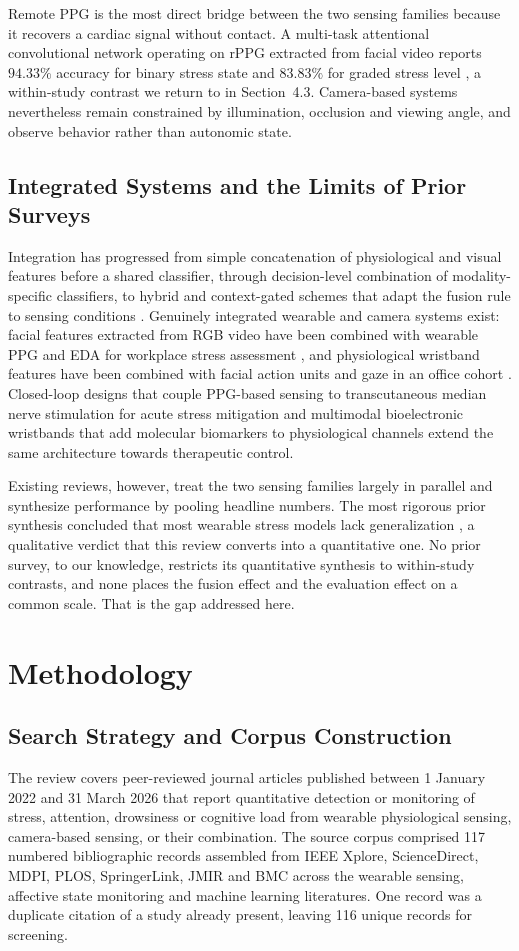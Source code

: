 Remote PPG is the most direct bridge between the two sensing families because it recovers a
cardiac signal without contact. A multi-task attentional convolutional network operating on
rPPG extracted from facial video reports $94.33\%$ accuracy for binary stress state and
$83.83\%$ for graded stress level \cite{r16}, a within-study contrast we return to in
Section~4.3. Camera-based systems nevertheless remain constrained by illumination, occlusion
and viewing angle, and observe behavior rather than autonomic state.

\subsection{Integrated Systems and the Limits of Prior Surveys}
Integration has progressed from simple concatenation of physiological and visual features
before a shared classifier, through decision-level combination of modality-specific
classifiers, to hybrid and context-gated schemes that adapt the fusion rule to sensing
conditions \cite{r58,r79}. Genuinely integrated wearable and camera systems exist: facial
features extracted from RGB video have been combined with wearable PPG and EDA for workplace
stress assessment \cite{r17}, and physiological wristband features have been combined with
facial action units and gaze in an office cohort \cite{r26}. Closed-loop designs that couple
PPG-based sensing to transcutaneous median nerve stimulation for acute stress mitigation
\cite{r38} and multimodal bioelectronic wristbands that add molecular biomarkers to
physiological channels \cite{r108} extend the same architecture towards therapeutic control.

Existing reviews, however, treat the two sensing families largely in parallel and synthesize
performance by pooling headline numbers. The most rigorous prior synthesis concluded that
most wearable stress models lack generalization \cite{r118}, a qualitative verdict that this
review converts into a quantitative one. No prior survey, to our knowledge, restricts its
quantitative synthesis to within-study contrasts, and none places the fusion effect and the
evaluation effect on a common scale. That is the gap addressed here.

\section{Methodology}

\subsection{Search Strategy and Corpus Construction}
The review covers peer-reviewed journal articles published between 1 January 2022 and
31 March 2026 that report quantitative detection or monitoring of stress, attention,
drowsiness or cognitive load from wearable physiological sensing, camera-based sensing, or
their combination. The source corpus comprised 117 numbered bibliographic records assembled
from IEEE Xplore, ScienceDirect, MDPI, PLOS, SpringerLink, JMIR and BMC across the wearable
sensing, affective state monitoring and machine learning literatures. One record was a
duplicate citation of a study already present, leaving 116 unique records for screening.

